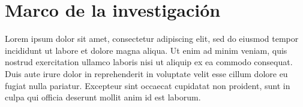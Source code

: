 
\chapter{Marco de la investigación}
\label{cha:marco_investigacion}

\ifpdf
    \graphicspath{{3_marco_investigacion/figures/PNG/}{3_marco_investigacion/figures/PDF/}{3_marco_investigacion/figures/}}
\else
    \graphicspath{{3_marco_investigacion/figures/EPS/}{3_marco_investigacion/figures/}}
\fi


Lorem ipsum dolor sit amet, consectetur adipiscing elit, sed do eiusmod tempor incididunt ut labore et dolore magna aliqua. Ut enim ad minim veniam, quis nostrud exercitation ullamco laboris nisi ut aliquip ex ea commodo consequat. Duis aute irure dolor in reprehenderit in voluptate velit esse cillum dolore eu fugiat nulla pariatur. Excepteur sint occaecat cupidatat non proident, sunt in culpa qui officia deserunt mollit anim id est laborum.





